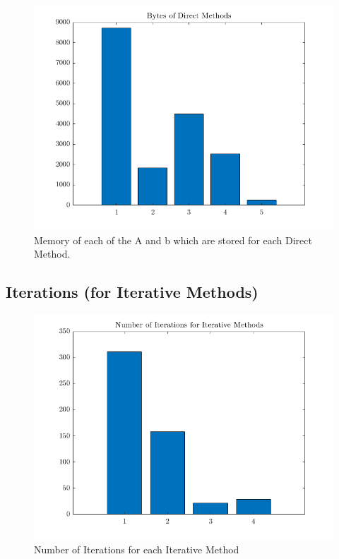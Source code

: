 \documentclass[12pt,a4paper]{article}
\begin{document}
\begin{figure}[H]
	\includegraphics[width=\linewidth]{images/MemoryGraph.png}
	\caption{Memory of each of the A and b which are stored for each Direct Method.}
	\label{fig:memory}
\end{figure}

\subsection{Iterations (for Iterative Methods)}
\begin{figure}[H]
	\includegraphics[width=\linewidth]{images/IterationsGraph.png}
	\caption{Number of Iterations for each Iterative Method}
	\label{fig:iterations}
\end{figure}
\end{document}
